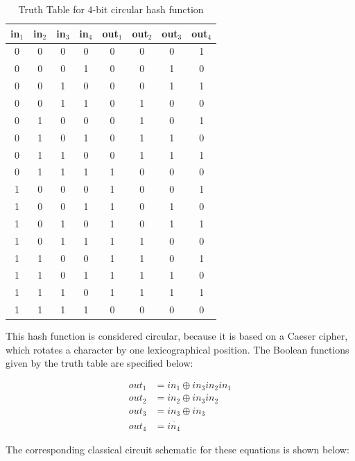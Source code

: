\documentclass{IEEEtran}
\begin{document}
\begin{table}[h!]
\caption{Truth Table for 4-bit circular hash function}
\begin{center}
\begin{tabular}{| c  c  c  c | c  c  c  c |}
    \hline
    in$_1$&in$_2$&in$_3$&in$_4$&out$_1$&out$_2$&out$_3$ & out$_4$ \\
    \hline
    \hline
    0&0&0&0&0&0&0&1 \\
    0&0&0&1&0&0&1&0 \\
    0&0&1&0&0&0&1&1 \\
    0&0&1&1&0&1&0&0 \\ 
    0&1&0&0&0&1&0&1 \\ 
    0&1&0&1&0&1&1&0 \\ 
    0&1&1&0&0&1&1&1 \\ 
    0&1&1&1&1&0&0&0 \\ 
    1&0&0&0&1&0&0&1 \\ 
    1&0&0&1&1&0&1&0 \\ 
    1&0&1&0&1&0&1&1 \\ 
    1&0&1&1&1&1&0&0 \\ 
    1&1&0&0&1&1&0&1 \\ 
    1&1&0&1&1&1&1&0 \\ 
    1&1&1&0&1&1&1&1 \\
    1&1&1&1&0&0&0&0 \\ 
    \hline
\end{tabular}
\end{center}

\end{table}

This hash function is considered circular, because it is based on a Caeser cipher, which rotates a character by one lexicographical position. 
The Boolean functions given by the truth table are specified below: 

\begin{align}
    out_1& = in_1 \oplus in_3in_2in_1\\
    out_2& = in_2 \oplus in_3in_2\\
    out_3& = in_3 \oplus in_3 \\
    out_4& = \overline{in_4} 
\end{align}

The corresponding classical circuit schematic for these equations is shown below: 
\end{document}
